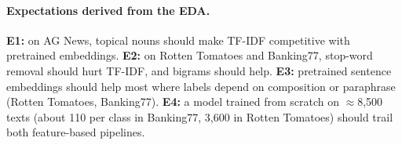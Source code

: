 \paragraph{Expectations derived from the EDA.}
\textbf{E1:} on AG News, topical nouns should make TF-IDF competitive with pretrained embeddings.
\textbf{E2:} on Rotten Tomatoes and Banking77, stop-word removal should hurt TF-IDF, and bigrams should help.
\textbf{E3:} pretrained sentence embeddings should help most where labels depend on composition or paraphrase (Rotten Tomatoes, Banking77).
\textbf{E4:} a model trained from scratch on ${\approx}$8{,}500 texts (about 110 per class in Banking77, 3{,}600 in Rotten Tomatoes) should trail both feature-based pipelines.
